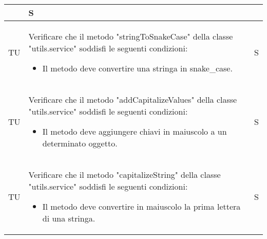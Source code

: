 \begin{adjustwidth}{-0.5cm}{-0.5cm}
\begin{longtable}{|P{1.5cm}|>{\raggedright}P{9.5cm}|>{\arraybackslash}P{1.5cm}|}
\begin{itemize}
    \end{itemize} & S \\
		\hline TU & Verificare che il metodo "stringToSnakeCase" della classe "utils.service" soddisfi le seguenti condizioni:
		\begin{itemize}
			\item Il metodo deve convertire una stringa in snake\_case.
    \end{itemize} & S \\
		\hline TU & Verificare che il metodo "addCapitalizeValues" della classe "utils.service" soddisfi le seguenti condizioni:
		\begin{itemize}
			\item Il metodo deve aggiungere chiavi in maiuscolo a un determinato oggetto.
    \end{itemize} & S \\
		\hline TU & Verificare che il metodo "capitalizeString" della classe "utils.service" soddisfi le seguenti condizioni:
		\begin{itemize}
			\item Il metodo deve convertire in maiuscolo la prima lettera di una stringa.
    \end{itemize} & S \\
	\end{longtable}
\end{adjustwidth}
\egroup
